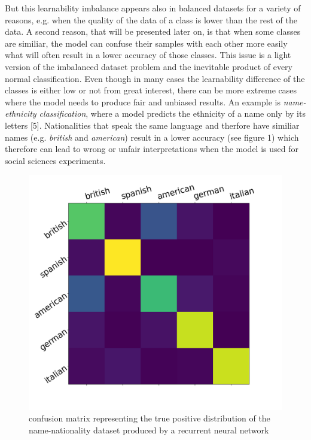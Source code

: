 \documentclass[journal]{IEEEtran}
\begin{document}

But this learnability imbalance appears also in balanced datasets for a variety of reasons, e.g. when the quality of the data of a class is lower than the rest of the data. 
A second reason, that will be presented later on, is that when some classes are similiar, %
the model can confuse their samples with each other more easily what will often result in a lower accuracy of those classes.
This issue is a light version of the imbalanced dataset problem and the inevitable product of every normal classification. 
Even though in many cases the learnability difference of the classes is either low or not from great interest, there can be more extreme cases where the model needs to produce fair and unbiased results. 
An example is \emph{name-ethnicity classification}, where a model predicts the ethnicity of a name only by its letters [5]. 
Nationalities that speak the same language and therfore have similiar names (e.g. \emph{british} and \emph{american}) result in a lower accuracy (see figure 1) which therefore can lead to wrong or unfair interpretations when the model is used for social sciences experiments. 

\begin{figure}[h!]
        \includegraphics[width=\linewidth]{images/nec_confusion_matrix.png}
        \caption{confusion matrix representing the true positive distribution of the name-nationality dataset produced by a recurrent neural network}
        \label{fig:tp_scores}
\end{figure}
\end{document}
